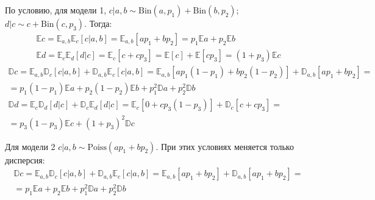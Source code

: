 \documentclass[12pt, a4paper]{article}
\begin{document}
            По условию, для модели 1, $c|a,b \sim \text{Bin}(a, p_1) + \text{Bin}(b, p_2)$; $d|c \sim c + \text{Bin}(c, p_3)$. Тогда:
            \begin{gather}
                \mathbb{E} c = \mathbb{E}_{a,b}\mathbb{E}_{c}[c|a,b] = \mathbb{E}_{a,b}[ap_1 + bp_2] = p_1 \mathbb{E} a + p_2 \mathbb{E} b \\
                \mathbb{E} d = \mathbb{E}_{c}\mathbb{E}_{d}[d|c] = \mathbb{E}_{c}[c + c p_3] = \mathbb{E}[c] + \mathbb{E}[c p_3] = (1 + p_3)\mathbb{E} c
            \end{gather}
            \begin{gather}
                \mathbb{D} c = \mathbb{E}_{a,b}\mathbb{D}_{c}[c|a,b] + \mathbb{D}_{a,b}\mathbb{E}_{c}[c|a,b] = \mathbb{E}_{a,b}[ap_1(1-p_1) + bp_2(1-p_2)] + \mathbb{D}_{a,b}[ap_1 + bp_2] = \nonumber\\
        = p_1 (1 - p_1) \mathbb{E} a + p_2 (1 - p_2) \mathbb{E} b + p_1^2 \mathbb{D} a + p_2^2 \mathbb{D} b\\
                \mathbb{D} d = \mathbb{E}_{c}\mathbb{D}_{d}[d|c] + \mathbb{D}_{c}\mathbb{E}_{d}[d|c] = \mathbb{E}_{c}[0 + c p_3(1 - p_3)] + \mathbb{D}_{c}[c + c p_3] = \nonumber\\ = p_3(1 - p_3) \mathbb{E}c + (1 + p_3)^2 \mathbb{D}c
            \end{gather}

            Для модели 2 $c|a,b \sim \text{Poiss}(ap_1 + bp_2)$. При этих условиях меняется только дисперсия:
            \begin{gather}
                \mathbb{D} c = \mathbb{E}_{a,b}\mathbb{D}_{c}[c|a,b] + \mathbb{D}_{a,b}\mathbb{E}_{c}[c|a,b] = \mathbb{E}_{a,b}[ap_1 + bp_2] + \mathbb{D}_{a,b}[ap_1 + bp_2] = \nonumber\\
        = p_1 \mathbb{E} a + p_2 \mathbb{E} b + p_1^2 \mathbb{D} a + p_2^2 \mathbb{D} b
            \end{gather}
\end{document}
